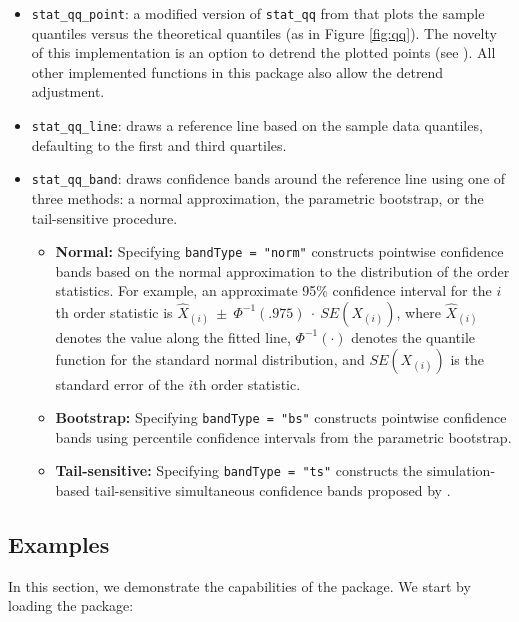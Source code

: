 \begin{itemize}
\item
  \texttt{stat\_qq\_point}: a modified version of \texttt{stat\_qq} from
   that plots the sample quantiles versus the theoretical
  quantiles (as in Figure \ref{fig:qq}). The novelty of this
  implementation is an option to detrend the plotted points (see
  ). All other implemented functions in this
  package also allow the detrend adjustment.
\item
  \texttt{stat\_qq\_line}: draws a reference line based on the sample
  data quantiles, defaulting to the first and third quartiles.
\item
  \texttt{stat\_qq\_band}: draws confidence bands around the reference
  line using one of three methods: a normal approximation, the
  parametric bootstrap, or the tail-sensitive procedure.

  \begin{itemize}
  \tightlist
  \item
    \textbf{Normal:} Specifying \texttt{bandType\ =\ "norm"} constructs
    pointwise confidence bands based on the normal approximation to the
    distribution of the order statistics. For example, an approximate
    95\% confidence interval for the \(i\)th order statistic is
    \(\widehat{X}_{(i)}~\pm~\Phi^{-1}(.975)~\cdot~SE(X_{(i)})\), where
    \(\widehat{X}_{(i)}\) denotes the value along the fitted line,
    \(\Phi^{-1}(\cdot)\) denotes the quantile function for the standard
    normal distribution, and \(SE(X_{(i)})\) is the standard error of
    the \(i\)th order statistic.
  \item
    \textbf{Bootstrap:} Specifying \texttt{bandType\ =\ "bs"} constructs
    pointwise confidence bands using percentile confidence intervals
    from the parametric bootstrap.
  \item
    \textbf{Tail-sensitive:} Specifying \texttt{bandType\ =\ "ts"}
    constructs the simulation-based tail-sensitive simultaneous
    confidence bands proposed by \citet{Aldor-Noiman2013-xw}.
  \end{itemize}
\end{itemize}

\subsection{Examples}\label{examples}

\label{sec:examples}

In this section, we demonstrate the capabilities of the 
package. We start by loading the package:

